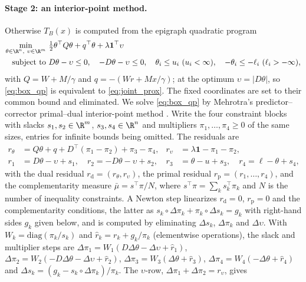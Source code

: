 \paragraph{Stage 2: an interior-point method.} Otherwise $T_B(x)$ is computed from the epigraph quadratic program
\begin{equation}
\begin{aligned}
\min_{\theta \in \R^n,\ \upsilon \in \R^m}\ & \tfrac12\theta^\top Q\theta + q^\top\theta + \lambda\mathbf 1^\top\upsilon \\
\text{subject to}\ & D\theta - \upsilon \le 0, \quad -D\theta - \upsilon \le 0, \quad \theta_i \le u_i\ (u_i < \infty), \quad -\theta_i \le -\ell_i\ (\ell_i > -\infty),
\end{aligned}
\label{eq:box_qp}
\end{equation}
with $Q = W + M/\gamma$ and $q = -(Wr + Mx/\gamma)$; at the optimum $\upsilon = |D\theta|$, so \eqref{eq:box_qp} is equivalent to \eqref{eq:joint_prox}. The fixed coordinates are set to their common bound and eliminated. We solve \eqref{eq:box_qp} by Mehrotra's predictor--corrector primal--dual interior-point method \citep{mehrotra1992implementation}. Write the four constraint blocks with slacks $s_1, s_2 \in \R^m$, $s_3, s_4 \in \R^n$ and multipliers $\pi_1, \ldots, \pi_4 \ge 0$ of the same sizes, entries for infinite bounds being omitted. The residuals are
\begin{align*}
r_\theta &= Q\theta + q + D^\top(\pi_1 - \pi_2) + \pi_3 - \pi_4, & r_\upsilon &= \lambda\mathbf 1 - \pi_1 - \pi_2, \\
r_1 &= D\theta - \upsilon + s_1, \quad r_2 = -D\theta - \upsilon + s_2, & r_3 &= \theta - u + s_3, \quad r_4 = \ell - \theta + s_4,
\end{align*}
with the dual residual $r_{\mathrm d} = (r_\theta, r_\upsilon)$, the primal residual $r_{\mathrm p} = (r_1, \ldots, r_4)$, and the complementarity measure $\bar\mu = s^\top\pi/N$, where $s^\top\pi = \sum_k s_k^\top\pi_k$ and $N$ is the number of inequality constraints. A Newton step linearizes $r_{\mathrm d} = 0$, $r_{\mathrm p} = 0$ and the complementarity conditions, the latter as $s_k\circ\Delta\pi_k + \pi_k\circ\Delta s_k = g_k$ with right-hand sides $g_k$ given below, and is computed by eliminating $\Delta s_k$, $\Delta\pi_k$ and $\Delta\upsilon$. With $W_k = \mathrm{diag}(\pi_k/s_k)$ and $\hat r_k = r_k + g_k/\pi_k$ (elementwise operations), the slack and multiplier steps are $\Delta\pi_1 = W_1(D\Delta\theta - \Delta\upsilon + \hat r_1)$, $\Delta\pi_2 = W_2(-D\Delta\theta - \Delta\upsilon + \hat r_2)$, $\Delta\pi_3 = W_3(\Delta\theta + \hat r_3)$, $\Delta\pi_4 = W_4(-\Delta\theta + \hat r_4)$ and $\Delta s_k = (g_k - s_k\circ\Delta\pi_k)/\pi_k$. The $\upsilon$-row, $\Delta\pi_1 + \Delta\pi_2 = r_\upsilon$, gives
